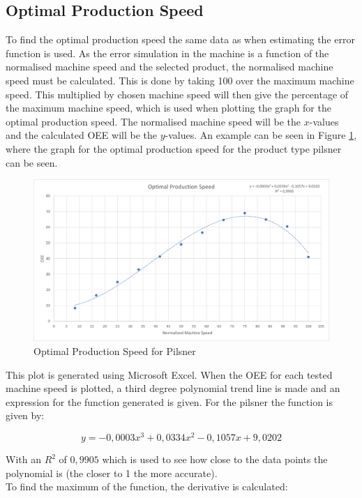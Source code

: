 \subsection{Optimal Production Speed}
To find the optimal production speed the same data as when estimating the error
function is used. As the error simulation in the machine is a function of the
normalised machine speed and the selected product, the normalised machine speed
must be calculated. This is done by taking 100 over the maximum machine speed.
This multiplied by chosen machine speed will then give the percentage of the 
maximum machine speed, which is used when plotting the graph for the optimal
production speed. The normalised machine speed will be the \(x\)-values and the
calculated OEE will be the \(y\)-values. An example can be seen in Figure
\ref{figure:ops_pilsner}, where the graph for the optimal production speed for
the product type pilsner can be seen.

\begin{figure}[ht]
	\centering
	\includegraphics[width=1\linewidth]{images/ops/pilsner.png}
	\caption{Optimal Production Speed for Pilsner}
	\label{figure:ops_pilsner}
\end{figure}

This plot is generated using Microsoft Excel. When the OEE for each tested
machine speed is plotted, a third degree polynomial trend line is made and an
expression for the function generated is given. For the pilsner the function is
given by:

\[y = -0,0003x^3+0,0334x^2-0,1057x+9,0202\]


With an \(R^2\) of \(0,9905\) which is used to see how close to the data points
the polynomial is (the closer to 1 the more accurate).\\

To find the maximum of the function, the derivative is calculated:

